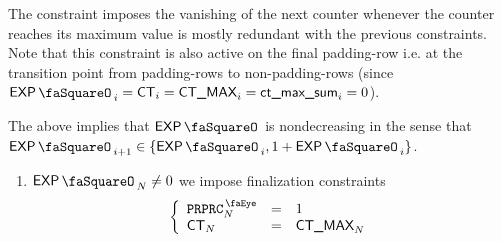 \saNote{} The constraint imposes the vanishing of the next counter whenever the counter reaches its maximum value is mostly redundant with the previous constraints.
Note that this constraint is also active on the final padding-row i.e. at the transition point from padding-rows to non-padding-rows (since $\expStamp_{i} = \ct_{i} = \maxCt_{i} = \maxCtFlagSum_{i} = 0$).

\saNote{} The above implies that $\expStamp$ is nondecreasing in the sense that $\expStamp_{i + 1} \in \{ \expStamp_{i}, 1 + \expStamp_{i} \}$.
\begin{enumerate}[resume]
	\item \lispTodo{} \If $\expStamp_{N} \neq 0$ \Then we impose finalization constraints
		\[
			\left\{ \begin{array}{lcl}
				\isPreprocessing _{N} & = & 1           \\
				\ct              _{N} & = & \maxCt _{N} \\
			\end{array} \right.
		\]
\end{enumerate}
